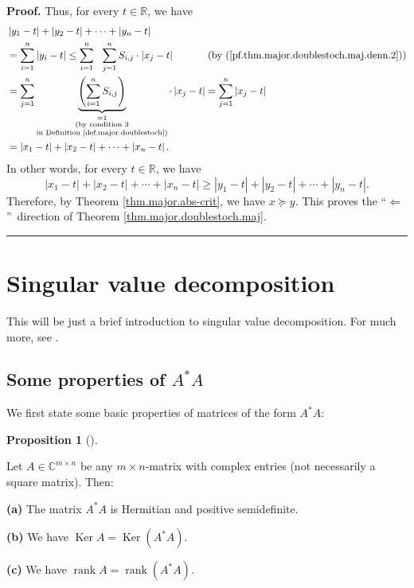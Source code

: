 \documentclass[numbers=enddot,12pt,final,onecolumn,notitlepage]{scrartcl}%
\numberwithin{exer}{subsection}
\theoremstyle{definition}
\newtheorem{prop}[theo]{Proposition}
\newenvironment{proposition}[1][]
{\begin{prop}[#1]\begin{leftbar}}
{\end{leftbar}\end{prop}}
\newenvironment{proof}[1][Proof]{\noindent\textbf{#1.} }{\ \rule{0.5em}{0.5em}}
\let\sumnonlimits\sum
\renewcommand{\sum}{\sumnonlimits\limits}
\begin{document}
\begin{proof}
Thus, for every $t\in\mathbb{R}$, we have%
\begin{align*}
&  \left\vert y_{1}-t\right\vert +\left\vert y_{2}-t\right\vert +\cdots
+\left\vert y_{n}-t\right\vert \\
&  =\sum_{i=1}^{n}\left\vert y_{i}-t\right\vert \leq\sum_{i=1}^{n}%
\ \ \sum_{j=1}^{n}S_{i,j}\cdot\left\vert x_{j}-t\right\vert
\ \ \ \ \ \ \ \ \ \ \left(  \text{by
(\ref{pf.thm.major.doublestoch.maj.denn.2})}\right) \\
&  =\sum_{j=1}^{n}\underbrace{\left(  \sum_{i=1}^{n}S_{i,j}\right)
}_{\substack{=1\\\text{(by condition 3}\\\text{in Definition
\ref{def.major.doublestoch})}}}\cdot\left\vert x_{j}-t\right\vert =\sum
_{j=1}^{n}\left\vert x_{j}-t\right\vert \\
&  =\left\vert x_{1}-t\right\vert +\left\vert x_{2}-t\right\vert
+\cdots+\left\vert x_{n}-t\right\vert .
\end{align*}
In other words, for every $t\in\mathbb{R}$, we have%
\[
\left\vert x_{1}-t\right\vert +\left\vert x_{2}-t\right\vert +\cdots
+\left\vert x_{n}-t\right\vert \geq\left\vert y_{1}-t\right\vert +\left\vert
y_{2}-t\right\vert +\cdots+\left\vert y_{n}-t\right\vert .
\]
Therefore, by Theorem \ref{thm.major.abs-crit}, we have $x\succcurlyeq y$.
This proves the \textquotedblleft$\Longleftarrow$\textquotedblright\ direction
of Theorem \ref{thm.major.doublestoch.maj}.
\end{proof}

\section{Singular value decomposition}

This will be just a brief introduction to singular value decomposition. For
much more, see \cite{TreBau97}.

\subsection{Some properties of $A^{\ast}A$}

We first state some basic properties of matrices of the form $A^{\ast}A$:

\begin{proposition}
[the $\operatorname*{Ker}\left(  A^{\ast}A\right)  $ lemma]%
\label{prop.SVD.A*A}Let $A\in\mathbb{C}^{m\times n}$ be any $m\times n$-matrix
with complex entries (not necessarily a square matrix). Then: \medskip

\textbf{(a)} The matrix $A^{\ast}A$ is Hermitian and positive semidefinite.
\medskip

\textbf{(b)} We have $\operatorname*{Ker}A=\operatorname*{Ker}\left(  A^{\ast
}A\right)  $. \medskip

\textbf{(c)} We have $\operatorname*{rank}A=\operatorname*{rank}\left(
A^{\ast}A\right)  $.
\end{proposition}
\end{document}
